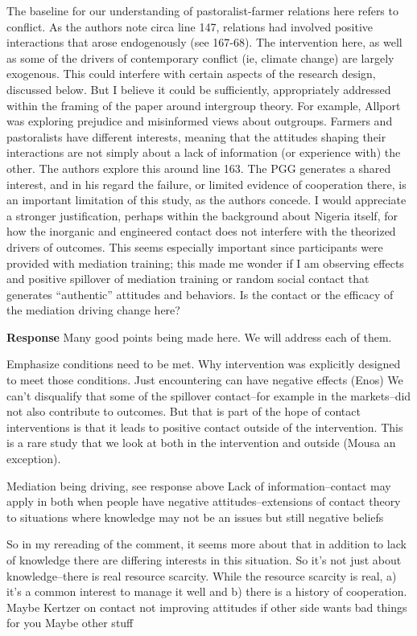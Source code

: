 \documentclass[
]{article}
\begin{document}
The baseline for our understanding of pastoralist-farmer relations here
refers to conflict. As the authors note circa line 147, relations had
involved positive interactions that arose endogenously (see 167-68). The
intervention here, as well as some of the drivers of contemporary
conflict (ie, climate change) are largely exogenous. This could
interfere with certain aspects of the research design, discussed below.
But I believe it could be sufficiently, appropriately addressed within
the framing of the paper around intergroup theory. For example, Allport
was exploring prejudice and misinformed views about outgroups. Farmers
and pastoralists have different interests, meaning that the attitudes
shaping their interactions are not simply about a lack of information
(or experience with) the other. The authors explore this around line
163. The PGG generates a shared interest, and in his regard the failure,
or limited evidence of cooperation there, is an important limitation of
this study, as the authors concede. I would appreciate a stronger
justification, perhaps within the background about Nigeria itself, for
how the inorganic and engineered contact does not interfere with the
theorized drivers of outcomes. This seems especially important since
participants were provided with mediation training; this made me wonder
if I am observing effects and positive spillover of mediation training
or random social contact that generates ``authentic'' attitudes and
behaviors. Is the contact or the efficacy of the mediation driving
change here?

\textbf{Response} Many good points being made here. We will address each
of them.

Emphasize conditions need to be met. Why intervention was explicitly
designed to meet those conditions. Just encountering can have negative
effects (Enos) We can't disqualify that some of the spillover
contact--for example in the markets--did not also contribute to
outcomes. But that is part of the hope of contact interventions is that
it leads to positive contact outside of the intervention. This is a rare
study that we look at both in the intervention and outside (Mousa an
exception).

Mediation being driving, see response above Lack of information--contact
may apply in both when people have negative attitudes--extensions of
contact theory to situations where knowledge may not be an issues but
still negative beliefs

So in my rereading of the comment, it seems more about that in addition
to lack of knowledge there are differing interests in this situation. So
it's not just about knowledge--there is real resource scarcity. While
the resource scarcity is real, a) it's a common interest to manage it
well and b) there is a history of cooperation. Maybe Kertzer on contact
not improving attitudes if other side wants bad things for you Maybe
other stuff
\end{document}

